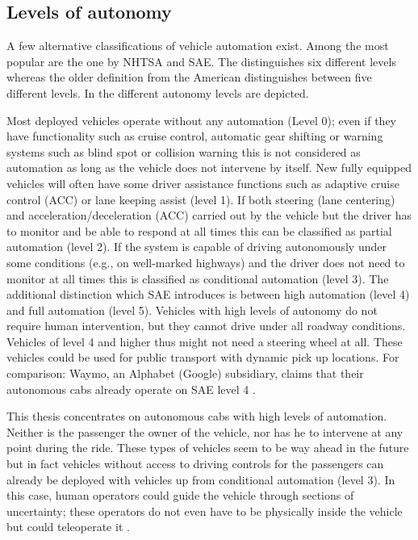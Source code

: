 \subsection{Levels of autonomy}\label{ssec:levels}
A few alternative classifications of vehicle automation exist. Among the most popular are the one by NHTSA and SAE. The \citet{SAEinternational2016} distinguishes six different levels whereas the older definition from the American \cite{NHTSA2013}  distinguishes between five different levels. In \emph{} the different autonomy levels are depicted. 

Most deployed vehicles operate without any automation (Level 0); even if they have functionality such as cruise control, automatic gear shifting or warning systems such as blind spot or collision warning this is not considered as automation as long as the vehicle does not intervene by itself. 
New fully equipped vehicles will often have some driver assistance functions such as adaptive cruise control (ACC) or lane keeping assist (level 1). If both steering (lane centering) and acceleration/deceleration (ACC) carried out by the vehicle but the driver has to monitor and be able to respond at all times this can be classified as partial automation (level 2). If the system is capable of driving autonomously under some conditions (e.g., on well-marked highways) and the driver does not need to monitor at all times this is classified as conditional automation (level 3). The additional distinction which SAE introduces is between high automation (level 4) and full automation (level 5). Vehicles with high levels of autonomy do not require human intervention, but they cannot drive under all roadway conditions. Vehicles of level 4 and higher thus might not need a steering wheel at all. These vehicles could be used for public transport with dynamic pick up locations. For comparison: Waymo, an Alphabet (Google) subsidiary, claims that their autonomous cabs already operate on SAE level 4 \citep{Waymo2018DriverlessApplication}. 

This thesis concentrates on autonomous cabs with high levels of automation. Neither is the passenger the owner of the vehicle, nor has he to intervene at any point during the ride. These types of vehicles seem to be way ahead in the future but in fact vehicles without access to driving controls for the passengers can already be deployed with vehicles up from conditional automation (level 3). In this case, human operators could guide the vehicle through sections of uncertainty; these operators do not even have to be physically inside the vehicle but could teleoperate it \citet{Hollander2016TheSystems}.  

